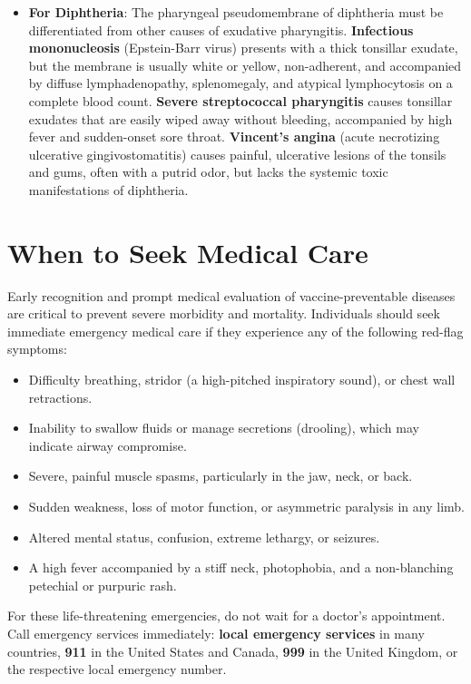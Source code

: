 \begin{itemize}
    \item \textbf{For Diphtheria}: The pharyngeal pseudomembrane of diphtheria must be differentiated from other causes of exudative pharyngitis. \textbf{Infectious mononucleosis} (Epstein-Barr virus) presents with a thick tonsillar exudate, but the membrane is usually white or yellow, non-adherent, and accompanied by diffuse lymphadenopathy, splenomegaly, and atypical lymphocytosis on a complete blood count. \textbf{Severe streptococcal pharyngitis} causes tonsillar exudates that are easily wiped away without bleeding, accompanied by high fever and sudden-onset sore throat. \textbf{Vincent's angina} (acute necrotizing ulcerative gingivostomatitis) causes painful, ulcerative lesions of the tonsils and gums, often with a putrid odor, but lacks the systemic toxic manifestations of diphtheria.
\end{itemize}

\section*{When to Seek Medical Care}
Early recognition and prompt medical evaluation of vaccine-preventable diseases are critical to prevent severe morbidity and mortality. Individuals should seek immediate emergency medical care if they experience any of the following red-flag symptoms:
\begin{itemize}
    \item Difficulty breathing, stridor (a high-pitched inspiratory sound), or chest wall retractions.
    \item Inability to swallow fluids or manage secretions (drooling), which may indicate airway compromise.
    \item Severe, painful muscle spasms, particularly in the jaw, neck, or back.
    \item Sudden weakness, loss of motor function, or asymmetric paralysis in any limb.
    \item Altered mental status, confusion, extreme lethargy, or seizures.
    \item A high fever accompanied by a stiff neck, photophobia, and a non-blanching petechial or purpuric rash.
\end{itemize}
For these life-threatening emergencies, do not wait for a doctor's appointment. Call emergency services immediately: \textbf{local emergency services} in many countries, \textbf{911} in the United States and Canada, \textbf{999} in the United Kingdom, or the respective local emergency number.

